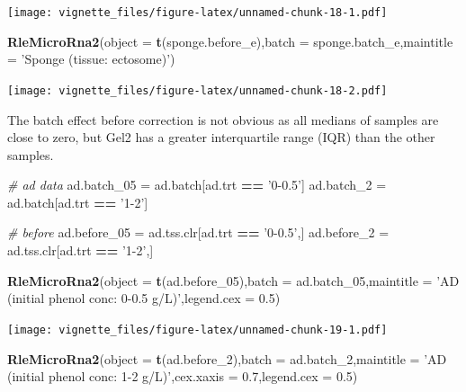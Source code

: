 \documentclass[]{book}
\newenvironment{Shaded}{\begin{snugshade}}{\end{snugshade}}
\newcommand{\KeywordTok}[1]{\textcolor[rgb]{0.13,0.29,0.53}{\textbf{#1}}}
\newcommand{\DataTypeTok}[1]{\textcolor[rgb]{0.13,0.29,0.53}{#1}}
\newcommand{\DecValTok}[1]{\textcolor[rgb]{0.00,0.00,0.81}{#1}}
\newcommand{\FloatTok}[1]{\textcolor[rgb]{0.00,0.00,0.81}{#1}}
\newcommand{\StringTok}[1]{\textcolor[rgb]{0.31,0.60,0.02}{#1}}
\newcommand{\CommentTok}[1]{\textcolor[rgb]{0.56,0.35,0.01}{\textit{#1}}}
\newcommand{\OperatorTok}[1]{\textcolor[rgb]{0.81,0.36,0.00}{\textbf{#1}}}
\newcommand{\NormalTok}[1]{#1}
\begin{document}
\texttt{[image: vignette\_files/figure-latex/unnamed-chunk-18-1.pdf]}

\begin{Shaded}
\begin{Highlighting}[]
\KeywordTok{RleMicroRna2}\NormalTok{(}\DataTypeTok{object =} \KeywordTok{t}\NormalTok{(sponge.before_e),}\DataTypeTok{batch =}\NormalTok{ sponge.batch_e,}\DataTypeTok{maintitle =} \StringTok{'Sponge (tissue: ectosome)'}\NormalTok{)}
\end{Highlighting}
\end{Shaded}

\texttt{[image: vignette\_files/figure-latex/unnamed-chunk-18-2.pdf]}

The batch effect before correction is not obvious as all medians of
samples are close to zero, but Gel2 has a greater interquartile range
(IQR) than the other samples.

\begin{Shaded}
\begin{Highlighting}[]
\CommentTok{# ad data}
\NormalTok{ad.batch_}\DecValTok{05}\NormalTok{ =}\StringTok{ }\NormalTok{ad.batch[ad.trt }\OperatorTok{==}\StringTok{ '0-0.5'}\NormalTok{]}
\NormalTok{ad.batch_}\DecValTok{2}\NormalTok{ =}\StringTok{ }\NormalTok{ad.batch[ad.trt }\OperatorTok{==}\StringTok{ '1-2'}\NormalTok{] }

\CommentTok{# before}
\NormalTok{ad.before_}\DecValTok{05}\NormalTok{ =}\StringTok{ }\NormalTok{ad.tss.clr[ad.trt }\OperatorTok{==}\StringTok{ '0-0.5'}\NormalTok{,]}
\NormalTok{ad.before_}\DecValTok{2}\NormalTok{ =}\StringTok{ }\NormalTok{ad.tss.clr[ad.trt }\OperatorTok{==}\StringTok{ '1-2'}\NormalTok{,]}

\KeywordTok{RleMicroRna2}\NormalTok{(}\DataTypeTok{object =} \KeywordTok{t}\NormalTok{(ad.before_}\DecValTok{05}\NormalTok{),}\DataTypeTok{batch =}\NormalTok{ ad.batch_}\DecValTok{05}\NormalTok{,}\DataTypeTok{maintitle =} \StringTok{'AD (initial phenol conc: 0-0.5 g/L)'}\NormalTok{,}\DataTypeTok{legend.cex =} \FloatTok{0.5}\NormalTok{)}
\end{Highlighting}
\end{Shaded}

\texttt{[image: vignette\_files/figure-latex/unnamed-chunk-19-1.pdf]}

\begin{Shaded}
\begin{Highlighting}[]
\KeywordTok{RleMicroRna2}\NormalTok{(}\DataTypeTok{object =} \KeywordTok{t}\NormalTok{(ad.before_}\DecValTok{2}\NormalTok{),}\DataTypeTok{batch =}\NormalTok{ ad.batch_}\DecValTok{2}\NormalTok{,}\DataTypeTok{maintitle =} \StringTok{'AD (initial phenol conc: 1-2 g/L)'}\NormalTok{,}\DataTypeTok{cex.xaxis =} \FloatTok{0.7}\NormalTok{,}\DataTypeTok{legend.cex =} \FloatTok{0.5}\NormalTok{)}
\end{Highlighting}
\end{Shaded}
\end{document}

